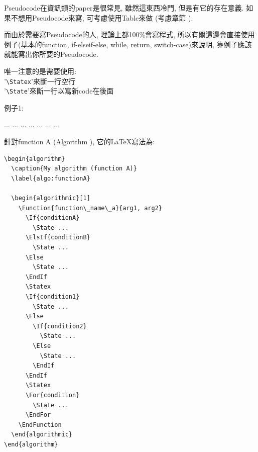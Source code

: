 
Pseudocode在資訊類的paper是很常見, 雖然這東西冷門, 但是有它的存在意義.
如果不想用Pseudocode來寫, 可考慮使用Table來做 (考慮章節 ).

而由於需要寫Pseudocode的人, 理論上都100\%會寫程式, 所以有關這邊會直接使用例子(基本的function, if-elseif-else, while, return, switch-case)來說明, 靠例子應該就能寫出你所要的Pseudocode.

唯一注意的是需要使用:\\
'\verb|\Statex|'來斷一行空行\\
'\verb|\State|'來斷一行以寫新code在後面


\newpage
例子1:
\begin{algorithm}
  \caption{My algorithm (function A)}
  \label{algo:functionA}

  \begin{algorithmic}[1]
        \State ...
        \State ...
      \Else
        \State ...
      \EndIf
      \Statex
        \State ...
      \Else
          \State ...
        \Else
          \State ...
        \EndIf
      \EndIf
      \Statex
        \State ...
      \EndFor
    \EndFunction
  \end{algorithmic}
\end{algorithm}

\newpage
針對function A (Algorithm ), 它的LaTeX寫法為:\\

\begin{DescriptionFrame}
  \begin{verbatim}
\begin{algorithm}
  \caption{My algorithm (function A)}
  \label{algo:functionA}

  \begin{algorithmic}[1]
    \Function{function\_name\_a}{arg1, arg2}
      \If{conditionA}
        \State ...
      \ElsIf{conditionB}
        \State ...
      \Else
        \State ...
      \EndIf
      \Statex
      \If{condition1}
        \State ...
      \Else
        \If{condition2}
          \State ...
        \Else
          \State ...
        \EndIf
      \EndIf
      \Statex
      \For{condition}
        \State ...
      \EndFor
    \EndFunction
  \end{algorithmic}
\end{algorithm}
  \end{verbatim}
\end{DescriptionFrame}

